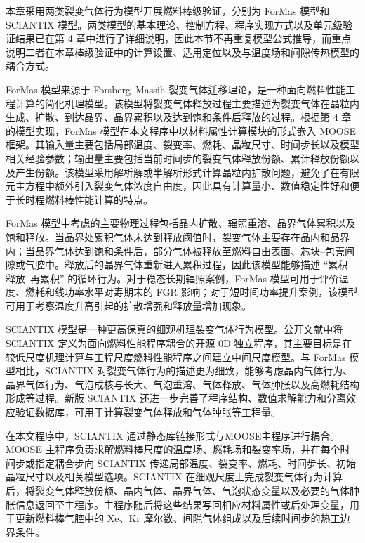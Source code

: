 
本章采用两类裂变气体行为模型开展燃料棒级验证，分别为 ForMas 模型和 SCIAN\allowbreak TIX 模型。两类模型的基本理论、控制方程、程序实现方式以及单元级验证结果已在第 4 章中进行了详细说明，因此本节不再重复模型公式推导，而重点说明二者在本章棒级验证中的计算设置、适用定位以及与温度场和间隙传热模型的耦合方式。

ForMas 模型来源于 Forsberg--Massih 裂变气体迁移理论，是一种面向燃料性能工程计算的简化机理模型。该模型将裂变气体释放过程主要描述为裂变气体在晶粒内生成、扩散、到达晶界、晶界累积以及达到饱和条件后释放的过程。根据第 4 章的模型实现，ForMas 模型在本文程序中以材料属性计算模块的形式嵌入 MOOSE 框架。其输入量主要包括局部温度、裂变率、燃耗、晶粒尺寸、时间步长以及模型相关经验参数；输出量主要包括当前时间步的裂变气体释放份额、累计释放份额以及产生份额。该模型采用解析解或半解析形式计算晶粒内扩散问题，避免了在有限元主方程中额外引入裂变气体浓度自由度，因此具有计算量小、数值稳定性好和便于长时程燃料棒性能计算的特点。

ForMas 模型中考虑的主要物理过程包括晶内扩散、辐照重溶、晶界气体累积以及饱和释放。当晶界处累积气体未达到释放阈值时，裂变气体主要存在晶内和晶界内；当晶界气体达到饱和条件后，部分气体被释放至燃料自由表面、芯块--包壳间隙或气腔中。释放后的晶界气体重新进入累积过程，因此该模型能够描述 ``累积--释放--再累积'' 的循环行为。对于稳态长期辐照案例，ForMas 模型可用于评价温度、燃耗和线功率水平对寿期末的 FGR 影响；对于短时间功率提升案例，该模型可用于考察温度升高引起的扩散增强和释放量增加现象。

SCIANTIX 模型是一种更高保真的细观机理裂变气体行为模型。公开文献中将 SCIANTIX 定义为面向燃料性能程序耦合的开源 0D 独立程序，其主要目标是在较低尺度机理计算与工程尺度燃料性能程序之间建立中间尺度模型。与 ForMas 模型相比，SCIANTIX 对裂变气体行为的描述更为细致，能够考虑晶内气体行为、晶界气体行为、气泡成核与长大、气泡重溶、气体释放、气体肿胀以及高燃耗结构形成等过程。新版 SCIANTIX 还进一步完善了程序结构、数值求解能力和分离效应验证数据库，可用于计算裂变气体释放和气体肿胀等工程量。

在本文程序中，SCIANTIX 通过静态库链接形式与MOOSE主程序进行耦合。MOOSE 主程序负责求解燃料棒尺度的温度场、燃耗场和裂变率场，并在每个时间步或指定耦合步向 SCIANTIX 传递局部温度、裂变率、燃耗、时间步长、初始晶粒尺寸以及相关模型选项。SCIANTIX 在细观尺度上完成裂变气体行为计算后，将裂变气体释放份额、晶内气体、晶界气体、气泡状态变量以及必要的气体肿胀信息返回至主程序。主程序随后将这些结果写回相应材料属性或后处理变量，用于更新燃料棒气腔中的 Xe、Kr 摩尔数、间隙气体组成以及后续时间步的热工边界条件。


